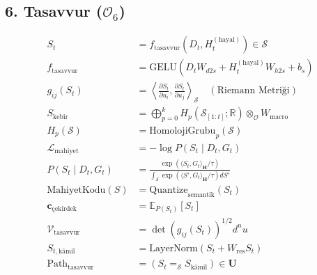 \documentclass[11pt, a4paper]{article}
\begin{document}
\subsection{6. Tasavvur ($\mathcal{O}_6$)}
\begin{align}
S_t &= f_{\text{tasavvur}}(D_t, H_t^{(\text{hayal})}) \in \mathcal{S} \\
f_{\text{tasavvur}} &= \text{GELU}(D_t W_{d2s} + H_t^{(\text{hayal})} W_{h2s} + b_s) \\
g_{ij}(S_t) &= \left\langle \frac{\partial S_t}{\partial u_i}, \frac{\partial S_t}{\partial u_j} \right\rangle_{\mathcal{S}} \quad (\text{Riemann Metriği}) \\
S_{\text{kebîr}} &= \bigoplus_{p=0}^k H_p\left( \mathcal{S}_{[1:t]}; \mathbb{R} \right) \otimes_{\mathcal{O}} W_{\text{macro}} \\
H_p(\mathcal{S}) &= \text{HomolojiGrubu}_p(\mathcal{S}) \\
\mathcal{L}_{\text{mahiyet}} &= -\log P(S_t \mid D_t, G_t) \\
P(S_t \mid D_t, G_t) &= \frac{\exp(\langle S_t, G_t \rangle_{\mathbf{H}} / \tau)}{\int_{\mathcal{S}} \exp(\langle S', G_t \rangle_{\mathbf{H}} / \tau) dS'} \\
\text{MahiyetKodu}(S) &= \text{Quantize}_{\text{semantik}}(S_t) \\
\mathbf{c}_{\text{çekirdek}} &= \mathbb{E}_{P(S_t)}[S_t] \\
\mathcal{V}_{\text{tasavvur}} &= \det(g_{ij}(S_t))^{1/2} d^n u \\
S_{t, \text{kâmil}} &= \text{LayerNorm}(S_t + W_{\text{res}} S_t) \\
\text{Path}_{\text{tasavvur}} &= (S_t =_{\mathcal{S}} S_{\text{kâmil}}) \in \mathbf{U}
\end{align}
\end{document}
